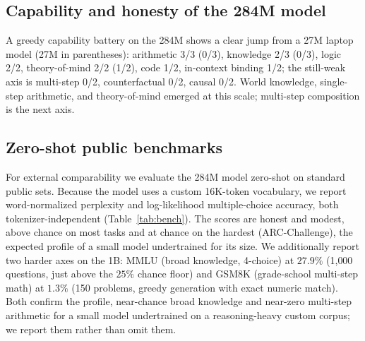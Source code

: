 \documentclass[10pt,twocolumn]{article}
\begin{document}
\subsection{Capability and honesty of the 284M model}
A greedy capability battery on the 284M shows a clear jump from a 27M laptop model (27M in parentheses): arithmetic 3/3 (0/3), knowledge 2/3 (0/3), logic 2/2, theory-of-mind 2/2 (1/2), code 1/2, in-context binding 1/2; the still-weak axis is multi-step 0/2, counterfactual 0/2, causal 0/2. World knowledge, single-step arithmetic, and theory-of-mind emerged at this scale; multi-step composition is the next axis.

\smallskip\noindent{}\smallskip

\subsection{Zero-shot public benchmarks}
For external comparability we evaluate the 284M model zero-shot on standard public sets. Because the model uses a custom 16K-token vocabulary, we report word-normalized perplexity and log-likelihood multiple-choice accuracy, both tokenizer-independent (Table~\ref{tab:bench}). The scores are honest and modest, above chance on most tasks and at chance on the hardest (ARC-Challenge), the expected profile of a small model undertrained for its size. We additionally report two harder axes on the 1B: MMLU (broad knowledge, 4-choice) at $27.9\%$ (1{,}000 questions, just above the $25\%$ chance floor) and GSM8K (grade-school multi-step math) at $1.3\%$ (150 problems, greedy generation with exact numeric match). Both confirm the profile, near-chance broad knowledge and near-zero multi-step arithmetic for a small model undertrained on a reasoning-heavy custom corpus; we report them rather than omit them.
\end{document}
